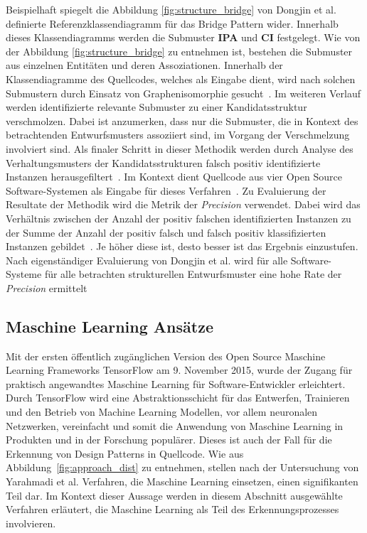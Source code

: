 Beispielhaft spiegelt die Abbildung \ref{fig:structure_bridge} von Dongjin et al. definierte Referenzklassendiagramm für das Bridge Pattern wider. Innerhalb dieses Klassendiagramms werden die Submuster \textbf{IPA} und \textbf{CI} festgelegt. Wie von der Abbildung \ref{fig:structure_bridge} zu entnehmen ist, bestehen die Submuster aus einzelnen Entitäten und deren Assoziationen.
Innerhalb der Klassendiagramme des Quellcodes, welches als Eingabe dient, wird nach solchen Submustern durch Einsatz von Graphenisomorphie gesucht~\cite[S. 584]{6649882}. Im weiteren Verlauf werden identifizierte relevante Submuster zu einer Kandidatsstruktur verschmolzen. Dabei ist anzumerken, dass nur die Submuster, die in Kontext des betrachtenden Entwurfsmusters assoziiert sind, im Vorgang der Verschmelzung involviert sind.
Als finaler Schritt in dieser Methodik werden durch Analyse des Verhaltungsmusters der Kandidatsstrukturen falsch positiv identifizierte Instanzen herausgefiltert~\cite[S. 584]{6649882}. Im Kontext dient Quellcode aus vier Open Source Software-Systemen als Eingabe für dieses Verfahren~\cite[S. 585]{6649882}. 
Zu Evaluierung der Resultate der Methodik wird die Metrik der \textit{Precision} verwendet. Dabei wird das Verhältnis zwischen der Anzahl der positiv falschen identifizierten Instanzen zu der Summe der Anzahl der positiv falsch und falsch positiv klassifizierten Instanzen gebildet~\cite[S. 585]{6649882}. Je höher diese ist, desto besser ist das Ergebnis einzustufen.
Nach eigenständiger Evaluierung von Dongjin et al. wird für alle Software-Systeme für alle betrachten strukturellen Entwurfsmuster eine hohe Rate der \textit{Precision} ermittelt~\cite[S. 586]{6649882}


\pagebreak

\subsection{Maschine Learning Ansätze}

Mit der ersten öffentlich zugänglichen Version des Open Source Maschine Learning Frameworks TensorFlow am 9. November 2015, wurde der Zugang für praktisch angewandtes Maschine Learning
für Software-Entwickler erleichtert. Durch TensorFlow wird eine Abstraktionsschicht für das Entwerfen, Trainieren und den Betrieb von Machine Learning Modellen, vor allem neuronalen Netzwerken, vereinfacht
und somit die Anwendung von Maschine Learning in Produkten und in der Forschung populärer. Dieses ist auch der Fall für die Erkennung von Design Patterns in Quellcode.
Wie aus Abbildung~\ref{fig:approach_dist} zu entnehmen, stellen nach der Untersuchung von Yarahmadi et al. Verfahren, die Maschine Learning einsetzen, einen signifikanten Teil dar.
Im Kontext dieser Aussage werden in diesem Abschnitt ausgewählte Verfahren erläutert, die Maschine Learning als Teil des Erkennungsprozesses involvieren.

